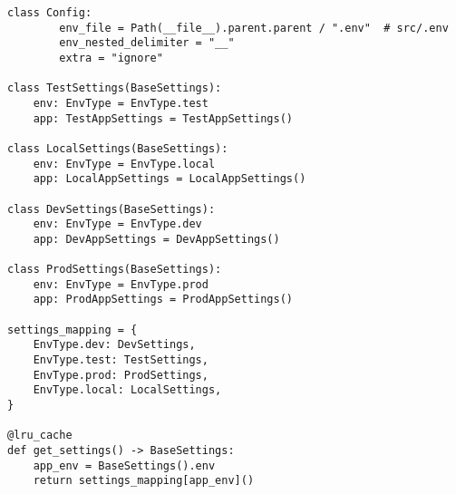 \begin{lstlisting}[style=pythonstyle]
    class Config:
        env_file = Path(__file__).parent.parent / ".env"  # src/.env
        env_nested_delimiter = "__"
        extra = "ignore"

class TestSettings(BaseSettings):
    env: EnvType = EnvType.test
    app: TestAppSettings = TestAppSettings()

class LocalSettings(BaseSettings):
    env: EnvType = EnvType.local
    app: LocalAppSettings = LocalAppSettings()

class DevSettings(BaseSettings):
    env: EnvType = EnvType.dev
    app: DevAppSettings = DevAppSettings()

class ProdSettings(BaseSettings):
    env: EnvType = EnvType.prod
    app: ProdAppSettings = ProdAppSettings()

settings_mapping = {
    EnvType.dev: DevSettings,
    EnvType.test: TestSettings,
    EnvType.prod: ProdSettings,
    EnvType.local: LocalSettings,
}

@lru_cache
def get_settings() -> BaseSettings:
    app_env = BaseSettings().env
    return settings_mapping[app_env]()
\end{lstlisting}
